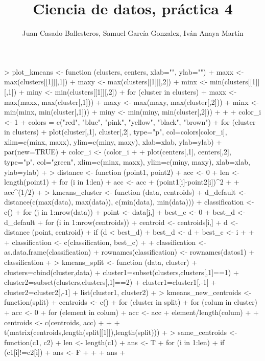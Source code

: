 \documentclass [a4paper] {article}
\title{Ciencia de datos, práctica 4}
\author{Juan Casado Ballesteros, Samuel García Gonzalez, Iván Anaya Martín}
\begin{document}
\maketitle

\begin{abstract}

\end{abstract}

\newpage
\tableofcontents

\begin{Schunk}
\begin{Sinput}
> plot_kmeans <- function (clusters, centers, xlab="", ylab="") {
+   maxx <- max(clusters[[1]][,1])
+   maxy <- max(clusters[[1]][,2])
+   minx <- min(clusters[[1]][,1])
+   miny <- min(clusters[[1]][,2])
+   for (cluster in clusters){
+     maxx <- max(maxx, max(cluster[,1]))
+     maxy <- max(maxy, max(cluster[,2]))
+     minx <- min(minx, min(cluster[,1]))
+     miny <- min(miny, min(cluster[,2]))
+ 
+   }
+   color_i <- 1
+   colors = c("red", "blue", "pink", "yellow", "black", "brown")
+   for (cluster in clusters){
+     plot(cluster[,1], cluster[,2], type="p", col=colors[color_i],  xlim=c(minx, maxx), ylim=c(miny, maxy), xlab=xlab, ylab=ylab)
+     par(new=TRUE)
+     color_i <- (color_i%%(length(colors)+1))+1
+   }
+   plot(centers[,1], centers[,2],   type="p", col="green", xlim=c(minx, maxx), ylim=c(miny, maxy), xlab=xlab, ylab=ylab)
+ }
> distance <- function (point1, point2) {
+   acc <- 0
+   len <- length(point1)
+   for (i in 1:len){
+     acc <- acc + (point1[i]-point2[i])^2
+   }
+   acc^(1/2)
+ }
> kmeans_cluster <- function (data, centroids) {
+   d_default <- distance(c(max(data), max(data)), c(min(data), min(data)))
+   classification <- c()
+   for (j in 1:nrow(data)){
+       point <- data[j,]
+       best_c <- 0
+       best_d <- d_default
+       for (i in 1:nrow(centroids)){
+         centroid <- centroids[i,]
+         d <- distance (point, centroid)
+         if (d < best_d){
+           best_d <- d
+           best_c <- i
+         }
+     }
+     classification <- c(classification, best_c)
+   }
+   classification <- as.data.frame(classification)
+   rownames(classification) <- rownames(datos1)
+   classification
+ }
> kmeans_split <- function (data, cluster) {
+   clusters=cbind(cluster,data)
+   cluster1=subset(clusters,clusters[,1]==1)
+   cluster2=subset(clusters,clusters[,1]==2)
+   cluster1=cluster1[,-1]
+   cluster2=cluster2[,-1]
+   list(cluster1, cluster2)
+ }
> kmeans_new_centroids <- function(split){
+   centroids <- c()
+   for (cluster in split) {
+     for (colum in cluster) {
+       acc <- 0
+       for (element in colum){
+         acc <- acc + element/length(colum)
+       }
+       centroids <- c(centroids, acc)
+     }
+   }
+   t(matrix(centroids,length(split[[1]]),length(split)))
+ }
> same_centroids <- function(c1, c2){
+   len <- length(c1)
+   ans <- T
+   for (i in 1:len){
+     if (c1[i]!=c2[i]){
+       ans <- F
+     }
+   }
+   ans
+ }
\end{Sinput}
\end{Schunk}
\end{document}
